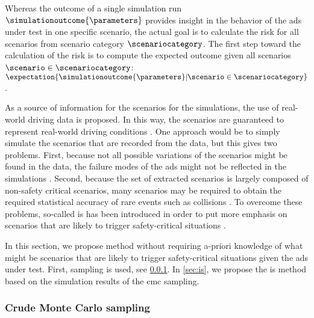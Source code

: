 Whereas the outcome of a single simulation run $\simulationoutcome{\parameters}$ provides insight in the behavior of the \ac{ads} under test in one specific scenario, the actual goal is to calculate the risk for all scenarios from scenario category $\scenariocategory$. 
The first step toward the calculation of the risk is to compute the expected outcome given all scenarios $\scenario\in\scenariocategory$: $\expectation{\simulationoutcome{\parameters}|\scenario\in\scenariocategory}$.

As a source of information for the scenarios for the simulations, the use of real-world driving data is proposed.
In this way, the scenarios are guaranteed to represent real-world driving conditions \autocite{elrofai2018scenario, putz2017pegasus, krajewski2018highD}.
One approach would be to simply simulate the scenarios that are recorded from the data, but this gives two problems.
First, because not all possible variations of the scenarios might be found in the data, the failure modes of the \ac{ads} might not be reflected in the simulations \autocite{zhao2018evaluation}.
Second, because the set of extracted scenarios is largely composed of non-safety critical scenarios, many scenarios may be required to obtain the required statistical accuracy of rare events such as collisions \autocite{zhao2018evaluation, jesenski2020scalable}.
To overcome these problems, so-called \ac{is} has been introduced in order to put more emphasis on scenarios that are likely to trigger safety-critical situations \autocite{zhao2018evaluation, xu2018accelerated, jesenski2020scalable}.

In this section, we propose  method without requiring a-priori knowledge of what might be scenarios that are likely to trigger safety-critical situations given the \ac{ads} under test.
First,  sampling is used, see \cref{sec:cmc}.
In \cref{sec:is}, we propose the \ac{is} method based on the simulation results of the \ac{cmc} sampling.



\subsubsection{Crude Monte Carlo sampling}
\label{sec:cmc}

